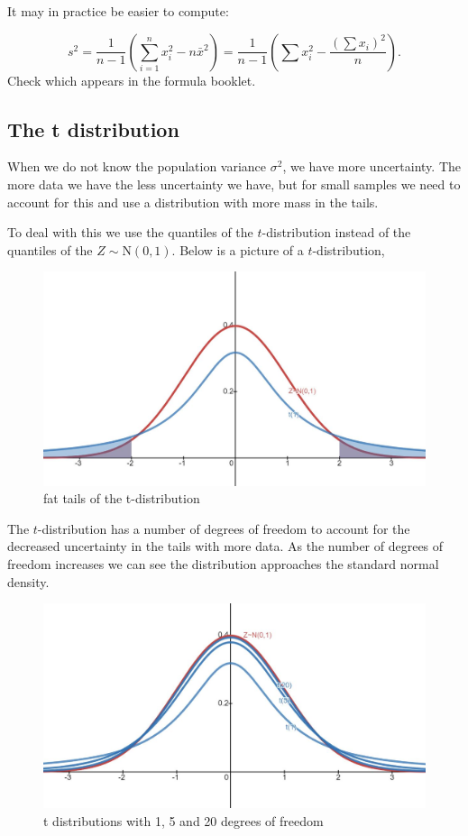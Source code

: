 \documentclass[
]{book}
\theoremstyle{definition}
\theoremstyle{definition}
\theoremstyle{definition}
\theoremstyle{definition}
\theoremstyle{remark}
\begin{document}
It may in practice be easier to compute:

\[s^2= \frac{1}{n-1}\left(\sum_{i=1}^n x_i^2 - n\bar{x}^2\right) = \frac{1}{n-1}\left(\sum x_i^2 - \frac{(\sum x_i)^2}{n}\right).\]
Check which appears in the formula booklet.

\hypertarget{the-t-distribution}{%
\subsection{The t distribution}\label{the-t-distribution}}

When we do not know the population variance \(\sigma^2\), we have more uncertainty. The more data we have the less uncertainty we have, but for small samples we need to account for this and use a distribution with more mass in the tails.

To deal with this we use the quantiles of the \(t\)-distribution instead of the quantiles of the \(Z\sim \text{N}(0,1)\). Below is a picture of a \(t\)-distribution,

\begin{figure}

{\centering \includegraphics[width=0.75\linewidth]{./figures/tdist} 

}

\caption{fat tails of the t-distribution}\label{fig:t1}
\end{figure}

The \(t\)-distribution has a number of degrees of freedom to account for the decreased uncertainty in the tails with more data. As the number of degrees of freedom increases we can see the distribution approaches the standard normal density.

\begin{figure}

{\centering \includegraphics[width=0.75\linewidth]{./figures/df} 

}

\caption{t distributions with 1, 5 and 20 degrees of freedom}\label{fig:t2}
\end{figure}
\end{document}

